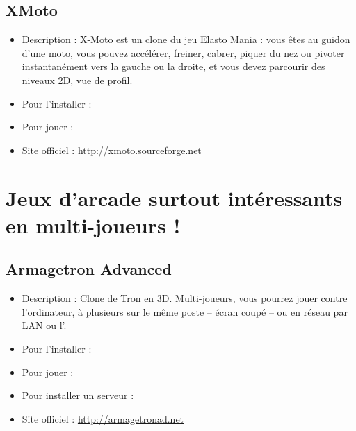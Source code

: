 \subsection{XMoto}
\begin{itemize}
\begingroup
{}
\item Description : X-Moto est un clone du jeu Elasto Mania : vous êtes au guidon d'une moto, vous pouvez accélérer, freiner, cabrer, piquer du nez ou pivoter instantanément vers la gauche ou la droite, et vous devez parcourir des niveaux 2D, vue de profil.{\par}
\item Pour l'installer : 
\item Pour jouer : 
\item Site officiel : \url{http://xmoto.sourceforge.net}{\par}
\endgroup
\end{itemize}
\section{Jeux d'arcade surtout intéressants en multi-joueurs !}
\subsection{Armagetron Advanced}
\begin{itemize}
\begingroup
{}
\item Description : Clone de Tron en 3D. Multi-joueurs, vous pourrez jouer contre l'ordinateur, à plusieurs sur le même poste -- écran coupé -- ou en réseau par LAN ou l'.{\par}
\endgroup
\item Pour l'installer : 
\item Pour jouer : 
\item Pour installer un serveur : 
\item Site officiel : \url{http://armagetronad.net}{\par}
\end{itemize}
